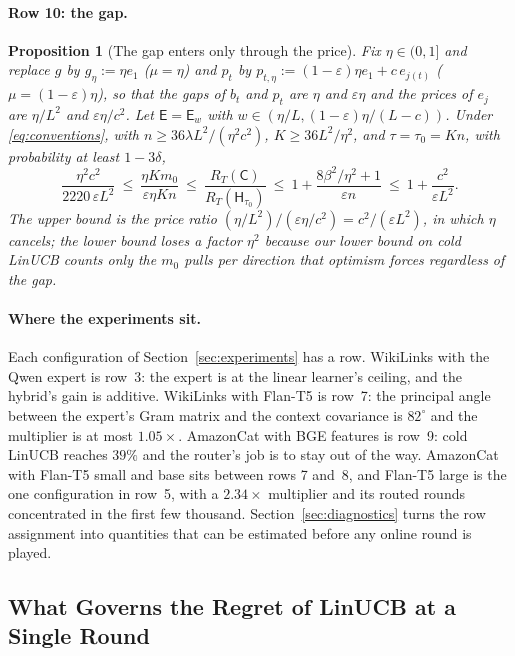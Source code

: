 \documentclass{article}
\newtheorem{proposition}{Proposition}
\theoremstyle{definition}
\theoremstyle{remark}
\newcommand{\eps}{\varepsilon}
\theoremstyle{remark}
\newcommand{\Cold}{\mathsf{C}}
\newcommand{\Exp}{\mathsf{E}}
\newcommand{\Hyb}{\mathsf{H}}
\begin{document}
\paragraph{Row 10: the gap.}
\begin{proposition}[The gap enters only through the price]
\label{prop:cat-gap}
Fix $\eta\in(0,1]$ and replace $g$ by $g_\eta:=\eta e_1$ ($\mu=\eta$) and
$p_t$ by $p_{t,\eta}:=(1-\eps)\eta e_1+c\,e_{j(t)}$ ($\mu=(1-\eps)\eta$), so that
the gaps of $b_t$ and $p_t$ are $\eta$ and $\eps\eta$ and the prices of
$e_j$ are $\eta/L^2$ and $\eps\eta/c^2$. Let $\Exp=\Exp_w$ with
$w\in(\eta/L,(1-\eps)\eta/(L-c))$. Under \eqref{eq:conventions}, with
$n\ge36\lambda L^2/(\eta^2c^2)$, $K\ge36L^2/\eta^2$, and $\tau=\tau_0=Kn$, with
probability at least $1-3\delta$,
\[
\frac{\eta^2c^2}{2220\,\eps L^2}\ \le\ \frac{\eta Km_0}{\eps\eta Kn}\ \le\
\frac{R_T(\Cold)}{R_T(\Hyb_{\tau_0})}\ \le\ 1+\frac{8\beta^2/\eta^2+1}{\eps n}\ \le\ 1+\frac{c^2}{\eps L^2}.
\]
The upper bound is the price ratio $(\eta/L^2)/(\eps\eta/c^2)=c^2/(\eps L^2)$,
in which $\eta$ cancels; the lower bound loses a factor $\eta^2$ because our
lower bound on cold LinUCB counts only the $m_0$ pulls per direction that
optimism forces regardless of the gap.
\end{proposition}

\paragraph{Where the experiments sit.}
Each configuration of Section~\ref{sec:experiments} has a row. WikiLinks with
the Qwen expert is row~3: the expert is at the linear learner's ceiling, and
the hybrid's gain is additive. WikiLinks with Flan-T5 is row~7: the principal
angle between the expert's Gram matrix and the context covariance is
$82^\circ$ and the multiplier is at most $1.05\times$. AmazonCat with BGE
features is row~9: cold LinUCB reaches $39\%$ and the router's job is to stay
out of the way. AmazonCat with Flan-T5 small and base sits between rows 7
and~8, and Flan-T5 large is the one configuration in row~5, with a
$2.34\times$ multiplier and its routed rounds concentrated in the first few
thousand. Section~\ref{sec:diagnostics} turns the row assignment into
quantities that can be estimated before any online round is played.



\subsection{What Governs the Regret of LinUCB at a Single Round}
\label{sec:width}
\end{document}

